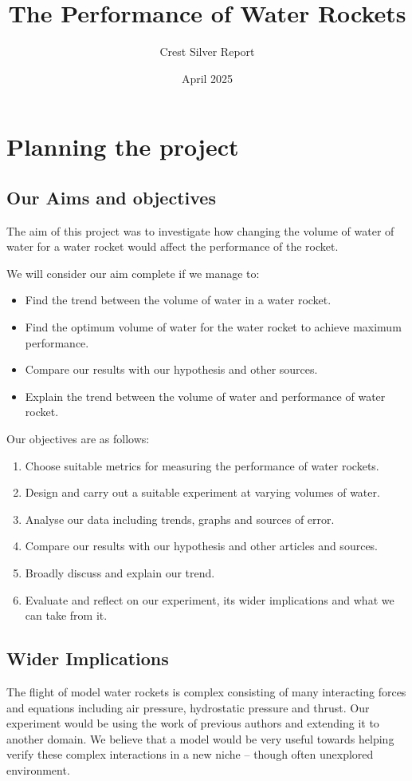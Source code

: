 \documentclass[14pt]{article}
\title{The Performance of Water Rockets}
\author{Crest Silver Report}
\date{April 2025}
\begin{document}

\maketitle
\tableofcontents
\section{Planning the project}
\subsection{Our Aims and objectives}

The aim of this project was to investigate how changing the volume of water of water for a water rocket would affect the performance of the rocket.

We will consider our aim complete if we manage to:
\begin{itemize}
    \item Find the trend between the volume of water in a water rocket.
    \item Find the optimum volume of water for the water rocket to achieve maximum performance.
    \item Compare our results with our hypothesis and other sources.
    \item Explain the trend between the volume of water and performance of water rocket.
\end{itemize}
Our objectives are as follows:
\begin{enumerate}
    \item Choose suitable metrics for measuring the performance of water rockets.
    \item Design and carry out a suitable experiment at varying volumes of water.
    \item Analyse our data including trends, graphs and sources of error.
    \item Compare our results with our hypothesis and other articles and sources.
    \item Broadly discuss and explain our trend.
    \item Evaluate and reflect on our experiment, its wider implications and what we can take from it.
\end{enumerate}
\subsection{Wider Implications}
The flight of model water rockets is complex consisting of many interacting forces and equations including air pressure, hydrostatic pressure and thrust. Our experiment would be using the work of previous authors and extending it to another domain. We believe that a model would be very useful towards helping verify these complex interactions in a new niche -- though often unexplored environment.
\end{document}

